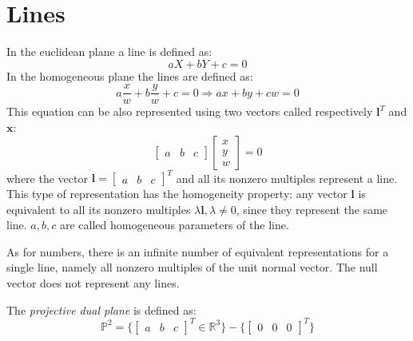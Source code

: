 \documentclass[12pt, a4paper]{report}
\begin{document}
    \section{Lines}
    In the euclidean plane a line is defined as: 
    \[aX+bY+c=0\]
    In the homogeneous plane the lines are defined as: 
    \[a\dfrac{x}{w}+b \dfrac{y}{w}+c=0 \Longrightarrow ax+by+cw=0\]
    This equation can be also represented using two vectors called respectively $\boldsymbol{l}^T$ and $\boldsymbol{x}$:
    \[\begin{bmatrix} a & b & c \end{bmatrix} \begin{bmatrix} x \\ y \\ w \end{bmatrix}=0\]
    where the vector $\boldsymbol{l}={\begin{bmatrix} a & b & c \end{bmatrix}}^T$ and all its nonzero multiples represent a line. This type of representation has the homogeneity
    property: any vector $\boldsymbol{l}$ is equivalent to all its nonzero multiples $\lambda \boldsymbol{l}, \lambda \neq 0$, since they represent the same line. $a,b,c$ are called 
    homogeneous parameters of the line. 

    As for numbers, there is an infinite number of equivalent representations for a single line, namely all nonzero multiples of the unit normal vector. The null vector does not
    represent any lines.
    \begin{definition}
        The \emph{projective dual plane} is defined as: 
        \[\mathbb{P}^2=\{{\begin{bmatrix} a & b & c \end{bmatrix}}^T \in \mathbb{R}^3\}-\{{\begin{bmatrix} 0 & 0 & 0 \end{bmatrix}}^T\}\]
    \end{definition}
\end{document}
